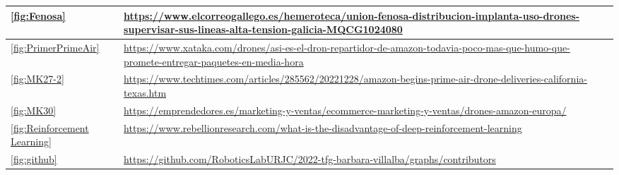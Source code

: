 \begin{tabular}{ | m{4cm} | m{10cm}| m{1cm} | }

    \hline 
    \ref{fig:Fenosa} & \url{https://www.elcorreogallego.es/hemeroteca/union-fenosa-distribucion-implanta-uso-drones-supervisar-sus-lineas-alta-tension-galicia-MQCG1024080} \\
    \hline
    \ref{fig:PrimerPrimeAir} & \url{https://www.xataka.com/drones/asi-es-el-dron-repartidor-de-amazon-todavia-poco-mas-que-humo-que-promete-entregar-paquetes-en-media-hora} \\ 
    \hline
    \ref{fig:MK27-2} & \url{https://www.techtimes.com/articles/285562/20221228/amazon-begins-prime-air-drone-deliveries-california-texas.htm} \\
    \hline
    \ref{fig:MK30} & \url{https://emprendedores.es/marketing-y-ventas/ecommerce-marketing-y-ventas/drones-amazon-europa/} \\
    \hline
    \ref{fig:Reinforcement Learning} & \url{https://www.rebellionresearch.com/what-is-the-disadvantage-of-deep-reinforcement-learning} \\
    \hline 
    \ref{fig:github} & \url{https://github.com/RoboticsLabURJC/2022-tfg-barbara-villalba/graphs/contributors} \\
    \hline 


\end{tabular}



